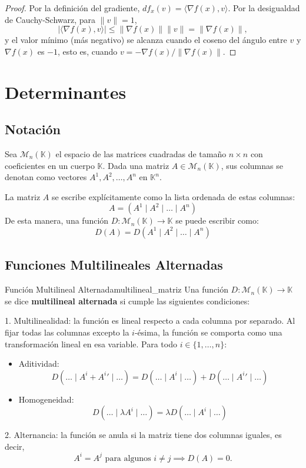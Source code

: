 \documentclass[11pt, a4paper]{article}
\begin{document}
\begin{proof}
Por la definición del gradiente, $df_x(v) = \langle \nabla f(x), v \rangle$. Por la desigualdad de Cauchy-Schwarz, para $\|v\| = 1$,
\[
|\langle \nabla f(x), v \rangle| \le \|\nabla f(x)\| \|v\| = \|\nabla f(x)\|,
\]
y el valor mínimo (más negativo) se alcanza cuando el coseno del ángulo entre $v$ y $\nabla f(x)$ es $-1$, esto es, cuando $v = -\nabla f(x)/\|\nabla f(x)\|$.
\end{proof}

\newpage

\section{Determinantes}

\subsection{Notación}

Sea $\mathcal{M}_{n}(\mathbb{K})$ el espacio de las matrices cuadradas de tamaño $n \times n$ con coeficientes en un cuerpo $\mathbb{K}$.
Dada una matriz $A \in \mathcal{M}_{n}(\mathbb{K})$, sus columnas se denotan como vectores $A^1, A^2, \dots, A^n$ en $\mathbb{K}^n$.

La matriz $A$ se escribe explícitamente como la lista ordenada de estas columnas:
\[
A = (A^1 \mid A^2 \mid \dots \mid A^n)
\]
De esta manera, una función $D: \mathcal{M}_{n}(\mathbb{K}) \to \mathbb{K}$ se puede escribir como:
\[
D(A) = D(A^1 \mid A^2 \mid \dots \mid A^n)
\]

\subsection{Funciones Multilineales Alternadas}

\begin{definicion}{Función Multilineal Alternada}{multilineal_matriz}
Una función $D: \mathcal{M}_{n}(\mathbb{K}) \to \mathbb{K}$ se dice \textbf{multilineal alternada} si cumple las siguientes condiciones:

1. Multilinealidad: la función es lineal respecto a cada columna por separado. Al fijar todas las columnas excepto la $i$-ésima, la función se comporta como una transformación lineal en esa variable.
Para todo $i \in \{1, \dots, n\}$:
\begin{itemize}
    \item Aditividad:
    \[ D(\dots \mid A^i + {A^i}' \mid \dots) = D(\dots \mid A^i \mid \dots) + D(\dots \mid {A^i}' \mid \dots) \]
    \item Homogeneidad:
    \[ D(\dots \mid \lambda A^i \mid \dots) = \lambda D(\dots \mid A^i \mid \dots) \]
\end{itemize}

2. Alternancia: la función se anula si la matriz tiene dos columnas iguales, es decir,
\[
A^i = A^j \text{ para algunos } i \neq j \implies D(A) = 0.
\]
\end{definicion}
\end{document}
